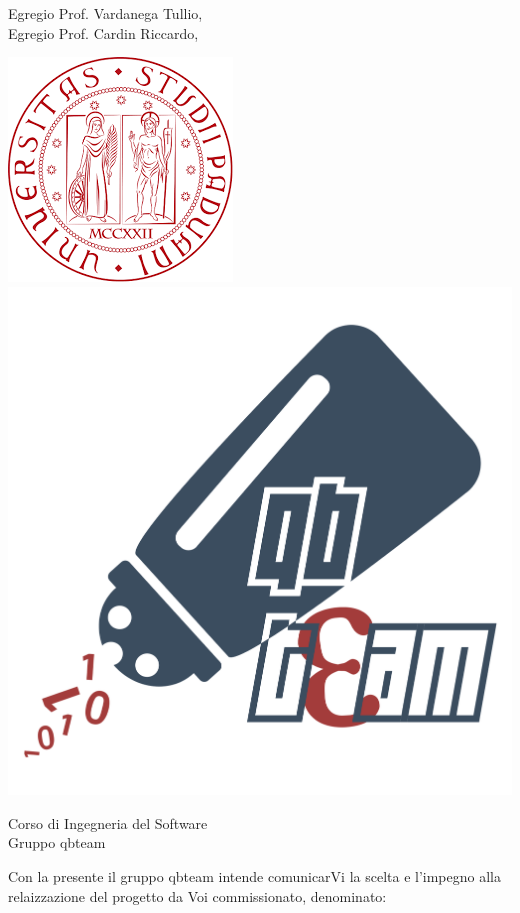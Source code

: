 \documentclass[12pt]{letter}
\begin{document}
    \begin{letter}
        { Egregio Prof. Vardanega Tullio,\\Egregio Prof. Cardin Riccardo,}
        \begin{center}
            \includegraphics[scale=0.5]{../Template/Immagini/logoUnipd.png}
            \includegraphics[scale=0.095]{../Template/Immagini/qbteam.png}
        \end{center}
        {
            Corso di Ingegneria del Software\\ Gruppo qbteam
        }
        \opening{ Con la presente il gruppo qbteam intende comunicarVi la scelta e l'impegno alla relaizzazione del progetto da Voi commissionato, denominato:}
        \begin{center}

\end{center}
\end{letter}
\end{document}
